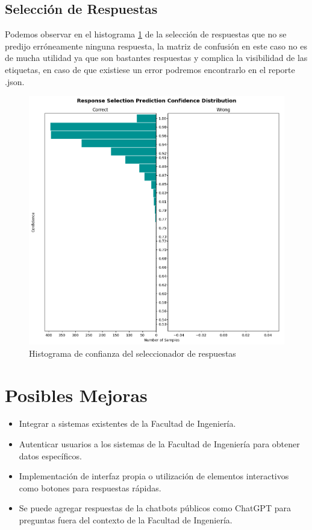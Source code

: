 \subsection{Selección de Respuestas}
Podemos observar en el histograma \ref{fig:response_histograma} de la selección de respuestas que no se predijo erróneamente ninguna respuesta, la matriz de confusión en este caso no es de mucha utilidad ya que son bastantes respuestas y complica la visibilidad de las etiquetas, en caso de que existiese un error podremos encontrarlo en el reporte .json.
\begin{figure}[h!]
    \centering
    \includegraphics[width=\textwidth]{imagenes/cap5/response_selection_histogram.png}
    \caption{Histograma de confianza del seleccionador de respuestas}
    \label{fig:response_histograma}
\end{figure}
\section{Posibles Mejoras}
\begin{itemize}
	\item Integrar a sistemas existentes de la Facultad de Ingeniería.
	\item Autenticar usuarios a los sistemas de la Facultad de Ingeniería para obtener datos
	      específicos.
	\item Implementación de interfaz propia o utilización de elementos interactivos como botones
	      para respuestas rápidas.
	\item Se puede agregar respuestas de la chatbots públicos como  ChatGPT para preguntas fuera del
	      contexto de la Facultad de Ingeniería.
\end{itemize}